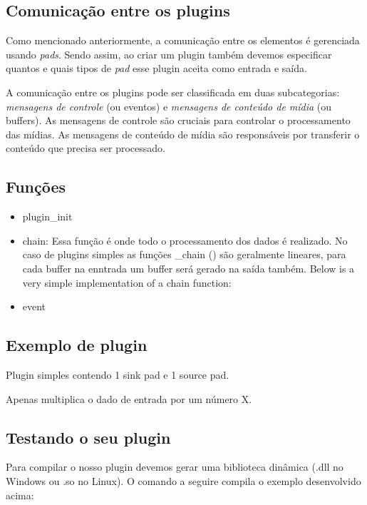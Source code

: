 \subsection*{Comunicação entre os plugins}
Como mencionado anteriormente, a comunicação entre os elementos é gerenciada
usando \emph{pads}.  Sendo assim, ao criar um plugin também devemos especificar
quantos e quais tipos de \emph{pad} esse plugin aceita como entrada e saída.


A comunicação entre os plugins pode ser classificada em duas subcategorias:
\emph{mensagens de controle} (ou eventos) e \emph{mensagens de conteúdo de
mídia} (ou buffers).  As mensagens de controle são cruciais para controlar o
processamento das mídias.  As mensagens de conteúdo de mídia são responsáveis
por transferir o conteúdo que precisa ser processado.

\subsection*{Funções}
\begin{itemize}
  \item plugin\_init
  \item chain: Essa função é onde todo o processamento dos dados é realizado.
        No caso de plugins simples as funções \_chain () são geralmente lineares,
        para cada buffer na enntrada um buffer será gerado na saída também.
        Below is a very simple implementation of a chain function: 
  \item event
\end{itemize}

\subsection*{Exemplo de plugin}
Plugin simples contendo 1 sink pad e 1 source pad.

Apenas multiplica o dado de entrada por um número X.

\subsection*{Testando o seu plugin}
Para compilar o nosso plugin devemos gerar uma biblioteca dinâmica (.dll no
Windows ou .so no Linux).  O comando a seguire compila o exemplo desenvolvido
acima:

